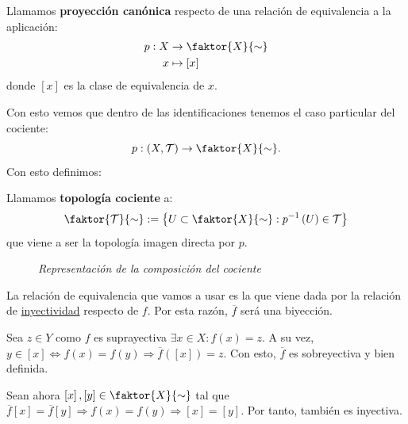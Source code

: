 \begin{defi}
Llamamos \textbf{proyección canónica} respecto de una relación de equivalencia a la aplicación:
\begin{align*}
    p: X &\rightarrow \faktor{X}{\sim}\\ 
    x &\mapsto \left[ x \right]
\end{align*}
donde $\left[ x \right]$ es la clase de equivalencia de $x$.
\end{defi}
Con esto vemos que dentro de las identificaciones tenemos el caso particular del cociente:
\[
p: \left( X, \mathcal{T} \right) \rightarrow \faktor{X}{\sim}.
\]
Con esto definimos:
\begin{defi}
Llamamos \textbf{topología cociente} a: 
\[
    \faktor{\mathcal{T}}{\sim} := \left\{ U \subset \faktor{X}{\sim}: p ^{-1}\left( U \right) \in \mathcal{T} \right\}
\]
que viene a ser la topología imagen directa por $p$.
\end{defi}

\begin{figure}[H]
    \centering    
        \caption{\textit{Representación de la composición del cociente}}
\end{figure}

\begin{obs}
La relación de equivalencia que vamos a usar es la que viene dada por la relación de \underline{inyectividad} respecto de $f$. Por esta razón, $\overline{f}$ será una biyección.
\end{obs}
\begin{demo}
Sea $z \in Y$ como $f$ es suprayectiva $\exists x \in X: f\left( x \right) = z$. A su vez, $y \in \left[ x \right] \Leftrightarrow f\left( x \right) = f\left( y \right) \Rightarrow \overline{f}\left( \left[ x \right] \right) = z$. Con esto, $\overline{f}$ es sobreyectiva y bien definida.

Sean ahora $\left[ x \right], \left[ y \right] \in \faktor{X}{\sim}$ tal que $\overline{f}\left[ x \right] = \overline{f}\left[ y \right] \Rightarrow f\left( x \right) = f\left( y \right) \Rightarrow \left[ x \right] = \left[ y \right]$. Por tanto, también es inyectiva.
\end{demo}

